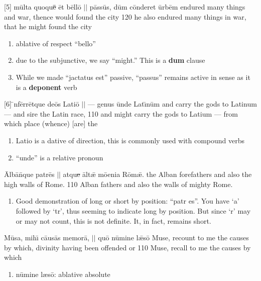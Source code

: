 \latline
{[5] m\=ult\-a qu\-oqu\={\sout{\=e\= }\=e}t b\=ell\={o} $||$ p\=ass\=us, d\=um c\=ond\-er\-et \=urb\=em}
{endured many things and war, thence would found the city}
{120}
{he also endured many things in war, that he might found the city}
{
\begin{enumerate}
	\item ablative of respect ``bell{\macron o}''
	\item due to the subjunctive, we say ``might.''  This is a \textbf{dum} clause
	\item While we made ``jactatus est'' passive, ``passus'' remains active in sense as it is a \textbf{deponent} verb
\end{enumerate}
}



\latline
{[6] \={\macron{\i}}nf\=err\=etqu\-e d\-e\={o}s L\-at\-i\={o} $||$ --- g\-en\-us \=und\-e L\-at\={\i}n\=um}
{and carry the gods to Latinum --- and sire the Latin race,}
{110}
{and might carry the gods to Latium --- from which place (whence) [are] the}
{
\begin{enumerate}
	\item Lati{\macron o} is a dative of direction, this is commonly used with compound verbs
	\item ``unde'' is a relative pronoun
\end{enumerate}
}


\latline
{\=Alb\={a}n\={\macron {\i}}qu\-e p\-atr\={e}s $||$ \-atqu\sout{e }\=alt\={\ae} m\={oe}n\-i\-a R\={\macron o}m\={\ae}.}
{the Alban forefathers and also the high walls of Rome.}
{110}
{Alban fathers and also the walls of mighty Rome.}
{
\begin{enumerate}
	\item Good demonstration of long or short by position: ``patr{\macron
e}s''. You have `a' followed by `tr', thus seeming to indicate long by
position. But since `r' may or may not count, this is not definite. It, in
fact, remains short.
\end{enumerate}
}

\latline
{M\={\macron u}s\-a, m\-ih\={\i} c\={au}s\={a}s m\-em\-or\={a}, $||$ qu\={o} n\={u}m\-in\-e l\={\ae}s\={o}}
{Muse, recount to me the causes by which, divinity having been offended or  }
{110}
{Muse, recall to me the causes by which }
{
\begin{enumerate}
	\item n\={u}mine l{\ae}s\=o: ablative absolute
\end{enumerate}
}




